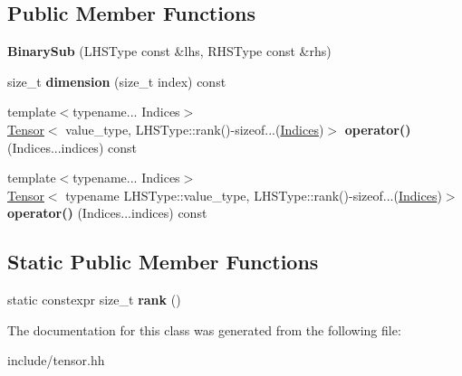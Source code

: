 \subsection*{Public Member Functions}
\begin{DoxyCompactItemize}
\item 
{\bfseries Binary\+Sub} (L\+H\+S\+Type const \&lhs, R\+H\+S\+Type const \&rhs)\hypertarget{classtensor_1_1BinarySub_a9e445dfd447cc821e888b5d3b56a7ed7}{}\label{classtensor_1_1BinarySub_a9e445dfd447cc821e888b5d3b56a7ed7}

\item 
size\+\_\+t {\bfseries dimension} (size\+\_\+t index) const \hypertarget{classtensor_1_1BinarySub_a1559ed04ae743d332a69fc6da4e5a028}{}\label{classtensor_1_1BinarySub_a1559ed04ae743d332a69fc6da4e5a028}

\item 
{\footnotesize template$<$typename... Indices$>$ }\\\hyperlink{classtensor_1_1Tensor}{Tensor}$<$ value\+\_\+type, L\+H\+S\+Type\+::rank()-\/sizeof...(\hyperlink{classtensor_1_1Indices}{Indices})$>$ {\bfseries operator()} (Indices...\+indices) const \hypertarget{classtensor_1_1BinarySub_a33b356458214b05cfc979d26275f9d02}{}\label{classtensor_1_1BinarySub_a33b356458214b05cfc979d26275f9d02}

\item 
{\footnotesize template$<$typename... Indices$>$ }\\\hyperlink{classtensor_1_1Tensor}{Tensor}$<$ typename L\+H\+S\+Type\+::value\+\_\+type, L\+H\+S\+Type\+::rank()-\/sizeof...(\hyperlink{classtensor_1_1Indices}{Indices})$>$ {\bfseries operator()} (Indices...\+indices) const \hypertarget{classtensor_1_1BinarySub_af00dabf68ca36b77513587d2042d5a90}{}\label{classtensor_1_1BinarySub_af00dabf68ca36b77513587d2042d5a90}

\end{DoxyCompactItemize}
\subsection*{Static Public Member Functions}
\begin{DoxyCompactItemize}
\item 
static constexpr size\+\_\+t {\bfseries rank} ()\hypertarget{classtensor_1_1BinarySub_a9859fdd59a47420ae0fdeb979c6272da}{}\label{classtensor_1_1BinarySub_a9859fdd59a47420ae0fdeb979c6272da}

\end{DoxyCompactItemize}


The documentation for this class was generated from the following file\+:\begin{DoxyCompactItemize}
\item 
include/tensor.\+hh\end{DoxyCompactItemize}
